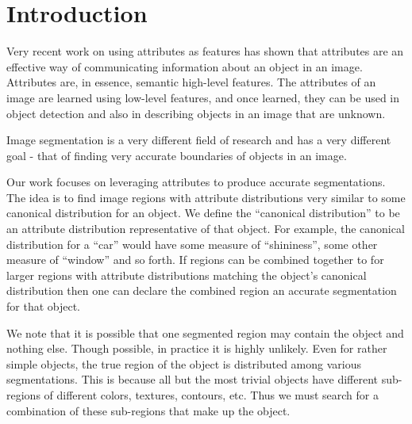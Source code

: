 \documentclass[10pt,twocolumn,letterpaper]{article}
\begin{document}
\section{Introduction}
Very recent work on using attributes as features \cite{farhadi09, lampert09}
has shown that attributes are an effective way of communicating information
about an object in an image.  Attributes are, in essence, semantic high-level
features.  The attributes of an image are learned using low-level features,
and once learned, they can be used in object detection and also in describing
objects in an image that are unknown.

Image segmentation is a very different field of research and has a very different
goal - that of finding very accurate boundaries of objects in an image.

Our work focuses on leveraging attributes to produce accurate segmentations.
The idea is to find image regions with attribute distributions very similar
to some canonical distribution for an object.  We define the ``canonical distribution''
to be an attribute distribution representative of that object.  For example, the
canonical distribution for a ``car'' would have some measure of ``shininess'', some
other measure of ``window'' and so forth.  If
regions can be combined together to for larger regions with attribute
distributions matching the object's canonical distribution then one can
declare the combined region an accurate segmentation for that object.

We note that it is possible that one segmented region may contain the object and
nothing else.  Though possible, in practice it is highly unlikely.  Even for rather
simple objects, the true region of the object is distributed among various
segmentations.  This is because all but the most trivial objects have different
sub-regions of different colors, textures, contours, etc.  Thus we must search
for a combination of these sub-regions that make up the object.
\end{document}
